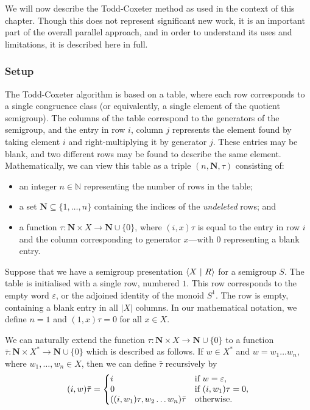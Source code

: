 We will now describe the Todd-Coxeter method as used in the context of this
chapter.  Though this does not represent significant new work, it is an
important part of the overall parallel approach, and in order to understand its
uses and limitations, it is described here in full.

\subsubsection{Setup}

The Todd-Coxeter algorithm is based on a table, where each row corresponds to a
single congruence class (or equivalently, a single element of the quotient
semigroup).  The columns of the table correspond to the generators of the
semigroup, and the entry in row $i$, column $j$ represents the element found by
taking element $i$ and right-multiplying it by generator $j$.  These entries may
be blank, and two different rows may be found to describe the same element.
Mathematically, we can view this table as a triple $(n, \mathbf{N}, \tau)$
consisting of:
\begin{itemize}
\item an integer $n \in \mathbb{N}$ representing the number of rows in the table;
\item a set $\mathbf{N} \subseteq \{1, \dots, n\}$ containing the indices of the
  \textit{undeleted} rows; and
\item a function $\tau: \mathbf{N} \times X \to \mathbf{N} \cup \{0\}$, where
  $(i, x)\tau$ is equal to the entry in row $i$ and the column corresponding to
  generator $x$---with $0$ representing a blank entry.
\end{itemize}

Suppose that we have a semigroup presentation $\left\langle X ~\middle|~ R \right\rangle$ for a semigroup
$S$.  The table is initialised with a single row, numbered $1$.  This row
corresponds to the empty word $\varepsilon$, or the adjoined identity of the
monoid $S^1$.  The row is empty, containing a blank entry in all $|X|$ columns.
In our mathematical notation, we define $n=1$ and
$(1,x)\tau = 0$ for all $x \in X$.

We can naturally extend the function
$\tau: \mathbf{N} \times X \to \mathbf{N} \cup \{0\}$
to a function 
$\bar{\tau}: \mathbf{N} \times X^* \to \mathbf{N} \cup \{0\}$
which is described as follows.
If $w \in X^*$ and $w=w_1 \dots w_n$, where $w_1, \dots, w_n \in X$,
then we can define $\bar\tau$ recursively by
$$
(i, w)\bar\tau = \left\{
\begin{matrix*}[l]
  i & \textnormal{if~} w=\varepsilon,\\
  0 & \textnormal{if~} (i, w_1)\tau=0,\\
  ((i, w_1)\tau, w_2 \dots w_n)\bar\tau & \textnormal{otherwise}.
\end{matrix*} \right.
$$

